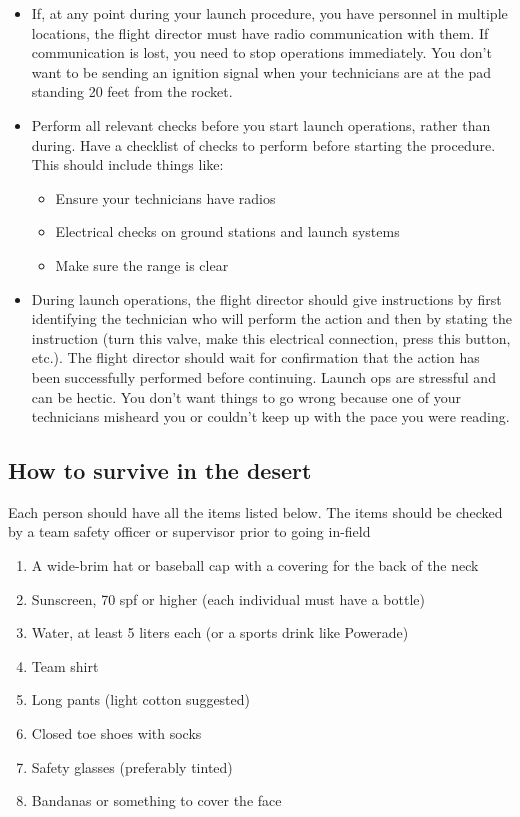 \begin{itemize}
\begin{itemize}
        \end{itemize}
        \item If, at any point during your launch procedure, you have personnel in multiple locations, the flight director must have radio communication with them. If communication is lost, you need to stop operations immediately. You don’t want to be sending an ignition signal when your technicians are at the pad standing 20 feet from the rocket.
        \item Perform all relevant checks before you start launch operations, rather than during. Have a checklist of checks to perform before starting the procedure. This should include things like:
        \begin{itemize}
            \item Ensure your technicians have radios 
            \item Electrical checks on ground stations and launch systems
            \item Make sure the range is clear
        \end{itemize}
        \item During launch operations, the flight director should give instructions by first identifying the technician who will perform the action and then by stating the instruction (turn this valve, make this electrical connection, press this button, etc.). The flight director should wait for confirmation that the action has been successfully performed before continuing. Launch ops are stressful and can be hectic. You don’t want things to go wrong because one of your technicians misheard you or couldn’t keep up with the pace you were reading.
    \end{itemize}

\subsection{How to survive in the desert}
    Each person should have all the items listed below. The items should be checked by a team safety officer or supervisor prior to going in-field
    \begin{enumerate}
    \item A wide-brim hat or baseball cap with a covering for the back of the neck
    \item Sunscreen, 70 spf or higher (each individual must have a bottle)
    \item Water, at least 5 liters each (or a sports drink like Powerade)
    \item Team shirt
    \item Long pants (light cotton suggested)
    \item Closed toe shoes with socks
    \item Safety glasses (preferably tinted)
    \item Bandanas or something to cover the face
    \end{enumerate}

